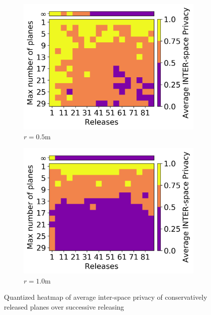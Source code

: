 \begin{figure}[t]
	\vspace{-2mm}
    \begin{subfigure}{0.49\columnwidth}
		\centering
		\includegraphics[width=\columnwidth]{figures/successive-varying-planes-heatmap-quantized-r05-3.png}
		\vspace{-5mm}
        \caption{\footnotesize $r = 0.5$m}
		\label{fig:varying-planes-heatmap}
	\end{subfigure}
    \begin{subfigure}[]{0.49\columnwidth}
		\centering
		\includegraphics[width=\columnwidth]{figures/successive-varying-planes-heatmap-quantized-r10-3.png}
		\vspace{-5mm}
		\caption{\footnotesize $r = 1.0$m }
		\label{fig:varying-planes-heatmap-r1}
	\end{subfigure}
	\caption{\small Quantized heatmap of average inter-space privacy of conservatively released planes over successive releasing}
	\label{fig:conservative-releasing-inter}
	\vspace{-5mm}
\end{figure}

